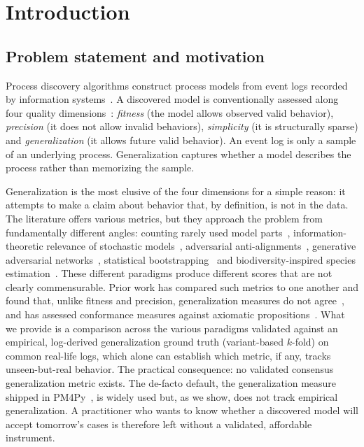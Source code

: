 \documentclass[runningheads]{llncs}
\begin{document}
\section{Introduction}
\label{sec:intro}

\subsection{Problem statement and motivation}
Process discovery algorithms construct process models from event logs recorded by information systems~\cite{vanderaalst2016pm}. A discovered model is conventionally assessed along four quality dimensions~\cite{buijs2014quality}: \emph{fitness} (the model allows observed valid behavior), \emph{precision} (it does not allow invalid behaviors), \emph{simplicity} (it is structurally sparse) and \emph{generalization} (it allows future valid behavior). An event log is only a sample of an underlying process. Generalization captures whether a model describes the process rather than memorizing the sample.

Generalization is the most elusive of the four dimensions for a simple reason: it attempts to make a claim about behavior that, by definition, is not in the data. The literature offers various metrics, but they approach the problem from fundamentally different angles: counting rarely used model parts~\cite{buijs2014quality}, information-theoretic relevance of stochastic models~\cite{alkhammash2022entropic}, adversarial anti-alignments~\cite{vandongen2016anti}, generative adversarial networks~\cite{theis2020avatar}, statistical bootstrapping~\cite{polyvyanyy2022bootstrap} and biodiversity-inspired species estimation~\cite{kabierski2023species}. These different paradigms produce different scores that are not clearly commensurable. Prior work has compared such metrics to one another and found that, unlike fitness and precision, generalization measures do not agree~\cite{janssenswillen2017comparative}, and has assessed conformance measures against axiomatic propositions~\cite{vanderaalst2018propositions,syring2019conformance}. What we provide is a comparison across the various paradigms validated against an empirical, log-derived generalization ground truth (variant-based $k$-fold) on common real-life logs, which alone can establish which metric, if any, tracks unseen-but-real behavior. The practical consequence: no validated consensus generalization metric exists. The de-facto default, the generalization measure shipped in PM4Py~\cite{berti2019pm4py}, is widely used but, as we show, does not track empirical generalization. A practitioner who wants to know whether a discovered model will accept tomorrow's cases is therefore left without a validated, affordable instrument.
\end{document}
